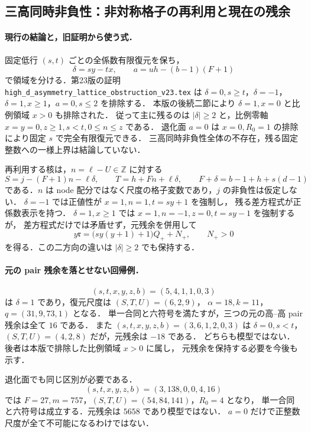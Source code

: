 \subsection{三高同時非負性：非対称格子の再利用と現在の残余}
\label{notes:hd24}\label{notes:hd23}

\paragraph{現行の結論と，旧証明から使う式．}

固定低行 $(s,t)$ ごとの全係数有限復元を保ち，
\[
 \delta=sy-tx,\qquad a=uh-(b-1)(F+1)
\]
で領域を分ける．第23版の証明
\nolinkurl{high_d_asymmetry_lattice_obstruction_v23.tex} は
$\delta=0,s\ge t$，$\delta=-1$，$\delta=1,x\ge1$，$a=0,s\le2$ を排除する．
本版の後続二節により $\delta=1,x=0$ と比例領域 $x>0$ も排除された．
従って主に残るのは $|\delta|\ge2$ と，比例零軸
$x=y=0,z\ge1,s<t,0\le n\le z$ である．
退化面 $a=0$ は $x=0,R_0=1$ の排除により固定 $s$ で完全有限復元できる．
三高同時非負性全体の不存在，残る固定整数への一様上界は結論していない．

再利用する核は，$n=\ell-U\in\mathbb Z$ に対する
\[
 S=j-(F+1)n-\ell\delta,\qquad
 T=h+Fn+\ell\delta,
 \qquad F+\delta=b-1+h+s(d-1)
\]
である．$n$ は node 配分ではなく尺度の格子変数であり，$j$ の非負性は仮定しない．
$\delta=-1$ では正値性が $x=1,n=1,t=sy+1$ を強制し，
残る差方程式が正係数表示を持つ．
$\delta=1,x\ge1$ では $x=1,n=-1,z=0,t=sy-1$ を強制するが，
差方程式だけでは矛盾せず，元残余を併用して
\[
 y\mathfrak r=\bigl(sy(y+1)+1\bigr)Q_++N_+,
 \qquad N_+>0
\]
を得る．この二方向の違いは $|\delta|\ge2$ でも保持する．

\paragraph{元の pair 残余を落とせない回帰例．}

\[
 (s,t,x,y,z,b)=(5,4,1,1,0,3)
\]
は $\delta=1$ であり，復元尺度は $(S,T,U)=(6,2,9)$，
$\alpha=18,k=11$，$q=(31,9,73,1)$ となる．
単一合同と六符号を満たすが，三つの元の高--高 pair 残余は全て $16$ である．
また $(s,t,x,y,z,b)=(3,6,1,2,0,3)$ は
$\delta=0,s<t$，$(S,T,U)=(4,2,8)$ だが，元残余は $-18$ である．
どちらも模型ではない．後者は本版で排除した比例領域 $x>0$ に属し，
元残余を保持する必要を今後も示す．

退化面でも同じ区別が必要である．
\[
 (s,t,x,y,z,b)=(3,138,0,0,4,16)
\]
では $F=27,m=757$，$(S,T,U)=(54,84,141)$，$R_0=4$ となり，
単一合同と六符号は成立する．元残余は $5658$ であり模型ではない．
$a=0$ だけで正整数尺度が全て不可能になるわけではない．

